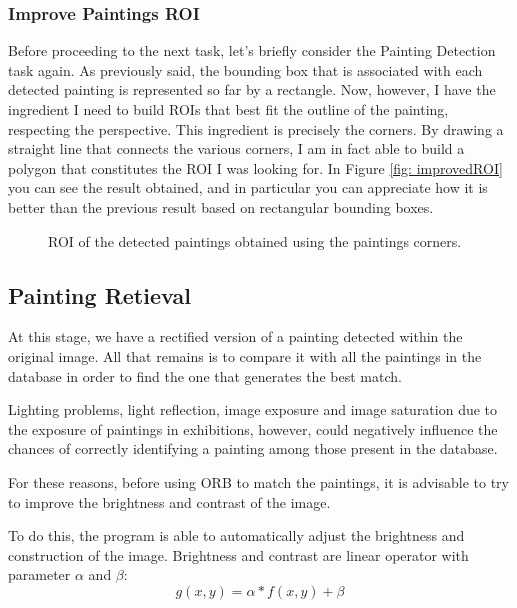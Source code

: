 \documentclass[10pt,twocolumn,letterpaper]{article}
\begin{document}
\subsubsection{Improve Paintings ROI}

Before proceeding to the next task, let's briefly consider the Painting Detection task again. As previously said, the bounding box that is associated with each detected painting is represented so far by a rectangle. Now, however, I have the ingredient I need to build ROIs that best fit the outline of the painting, respecting the perspective. This ingredient is precisely the corners. By drawing a straight line that connects the various corners, I am in fact able to build a polygon that constitutes the ROI I was looking for. In Figure \ref{fig: improvedROI} you can see the result obtained, and in particular you can appreciate how it is better than the previous result based on rectangular bounding boxes.

\begin{figure}[t]
   \begin{center}
   \fbox{\rule{0pt}{2in} \rule{0.9\linewidth}{0pt}}
   \end{center}
      \caption{ROI of the detected paintings obtained using the paintings corners.}
   \label{fig:improvedROI}
\end{figure}


\subsection{Painting Retieval}

At this stage, we have a rectified version of a painting detected within the original image. All that remains is to compare it with all the paintings in the database in order to find the one that generates the best match.

Lighting problems, light reflection, image exposure and image saturation due to the exposure of paintings in exhibitions, however, could negatively influence the chances of correctly identifying a painting among those present in the database.

For these reasons, before using ORB to match the paintings, it is advisable to try to improve the brightness and contrast of the image.

To do this, the program is able to automatically adjust the brightness and construction of the image. Brightness and contrast are linear operator with parameter $\alpha$ and $\beta$:
\begin{equation} 
   g(x,y)= \alpha * f(x,y)+ \beta 
   \label{eq:2}
\end{equation}
\end{document}
